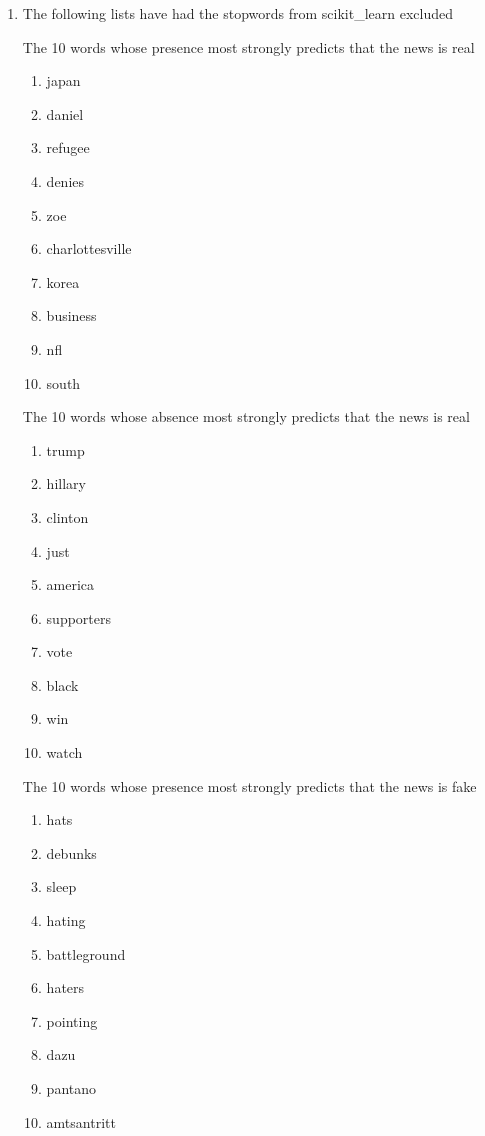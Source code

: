 \documentclass[10pt,letterpaper]{article}
\begin{document}
\begin{enumerate}
\begin{enumerate}

			\item %
			The following lists have had the stopwords from scikit\_learn excluded

			The 10 words whose presence most strongly predicts that the news is real
			\begin{enumerate}
				\item japan
				\item daniel
				\item refugee
				\item denies
				\item zoe
				\item charlottesville
				\item korea
				\item business
				\item nfl
				\item south
			\end{enumerate}

			The 10 words whose absence most strongly predicts that the news is real
			\begin{enumerate}
				\item trump
				\item hillary
				\item clinton
				\item just
				\item america
				\item supporters
				\item vote
				\item black
				\item win
				\item watch
			\end{enumerate}

			The 10 words whose presence most strongly predicts that the news is fake
			\begin{enumerate}
				\item hats
				\item debunks
				\item sleep
				\item hating
				\item battleground
				\item haters
				\item pointing
				\item dazu
				\item pantano
				\item amtsantritt
			\end{enumerate}


\end{enumerate}
\end{enumerate}
\end{document}
